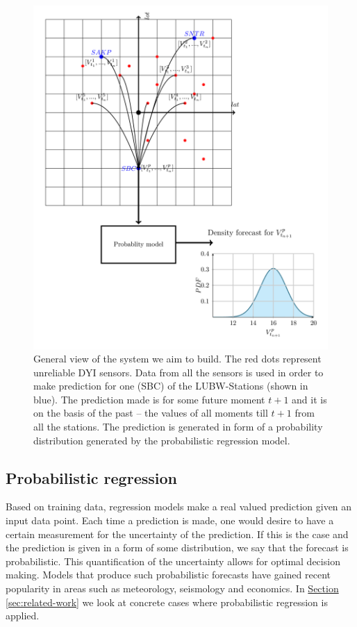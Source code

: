 \documentclass[12pt,a4paper,twoside]{scrartcl}
\numberwithin{equation}{section}
\newcommand{\refsec}[1]{\hyperref[#1]{Section \ref*{#1}}}
\begin{document}
\begin{center}
  \begin{figure}[htbp]
    \centering
    \includegraphics[height=1\textwidth, width=1\textwidth]{figures/general_system.png}
    \caption[General system]{General view of the system we aim to build. The red dots represent unreliable DYI sensors. Data from all the sensors is used in order to make prediction for one (SBC) of the LUBW-Stations (shown in blue). The prediction made is for some future moment \(t+1\) and it is on the basis of the past -- the values of all moments till \(t+1\) from all the stations. The prediction is generated in form of a probability distribution generated by the probabilistic regression model.}\label{fig:general}
  \end{figure}
\end{center}
\subsection{Probabilistic regression}\label{sec:prob-regression}
Based on training data, regression models make a real valued prediction given an input data point. Each time a prediction is made, one would desire to have a certain measurement for the uncertainty of the prediction. If this is the case and the prediction is given in a form of some distribution, we say that the forecast is probabilistic. This quantification of the uncertainty allows for optimal decision making. Models that produce such probabilistic forecasts have gained recent popularity in areas such as meteorology, seismology and economics. In \refsec{sec:related-work} we look at concrete cases where probabilistic regression is applied.
\end{document}
